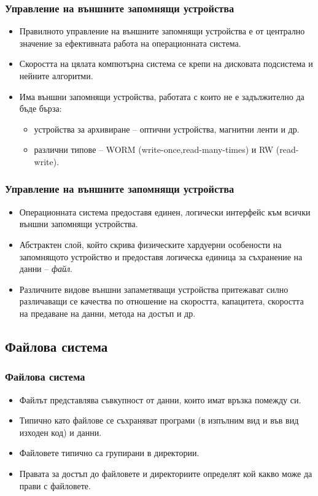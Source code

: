 \documentclass[ignorenonframetext, hyperref=unicode]{beamer}
\begin{document}
\begin{frame}
\frametitle{Управление на външните запомнящи устройства}
\begin{itemize}
\item Правилното управление на външните запомнящи устройства е от централно
значение за ефективната работа на операционната система.
\item Скоростта на цялата компютърна система се крепи на дисковата подсистема и
нейните алгоритми.
\item Има външни запомнящи устройства, работата с които не е задължително да
бъде бърза:
\begin{itemize}
  \item устройства за архивиране -- оптични устройства, магнитни ленти и др.
  \item различни типове -- WORM (write-once,read-many-times) и RW (read-write).
\end{itemize}
\end{itemize}
\end{frame}
         
\begin{frame}
\frametitle{Управление на външните запомнящи устройства}
\begin{itemize}
\item Операционната система предоставя единен, логически интерфейс към всички
външни запомнящи устройства.
\item Абстрактен слой, който скрива физическите хардуерни особености на
запомнящото устройство и предоставя логическа единица за съхранение на данни --
{\em файл}.
\item Различните видове външни запаметяващи устройства притежават силно
различаващи се качества по отношение на скоростта, капацитета, скоростта на
предаване на данни, метода на достъп и др.
\end{itemize}
\end{frame}

\subsection{Файлова система}

\begin{frame}
\frametitle{Файлова система}
\begin{itemize}
\item Файлът представлява съвкупност от данни, които имат връзка помежду си.
\item Типично като файлове се съхраняват програми (в изпълним вид и във вид
изходен код) и данни.
\item Файловете типично са групирани в директории.
\item Правата за достъп до файловете и директориите определят кой какво може да
прави с файловете.
\end{itemize}
\end{frame}
\end{document}
